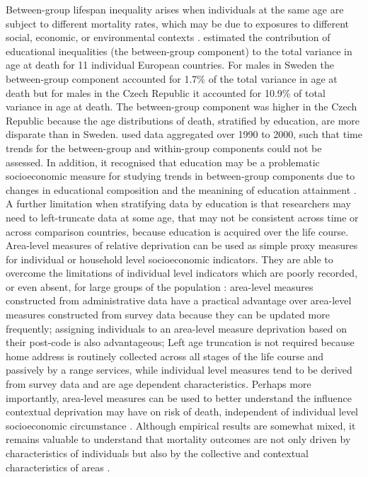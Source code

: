 \documentclass[12pt,oneside,a4paper]{article} %
\theoremstyle{definition}
\begin{document}
Between-group lifespan inequality arises when individuals at the same age are
subject to different mortality rates, which may be due to exposures to
different social, economic, or environmental contexts \citep{Hartemink2017}.
\citet{Raalte2012} estimated the contribution of educational inequalities (the
between-group component) to the total variance in age at death for 11 individual European countries. For males in Sweden the between-group component accounted for 1.7\% of the total variance in age at death but for males in the Czech Republic it accounted for 10.9\% of total variance in age at death. The between-group component was higher in the Czech Republic because the age distributions of death, stratified by education, are more disparate than in Sweden. 
\citet{Raalte2012} used data aggregated over 1990 to 2000, such
that time trends for the between-group and within-group components could not be assessed. 
In addition, it recognised that education may be a problematic socioeconomic
measure for studying trends in between-group components due to
changes in educational composition and the meanining of education attainment
\citep{Raalte2012,Hendi2015}.
A further limitation when stratifying data by education is that researchers
may need to left-truncate data at some age, that may not be consistent across time or across comparison countries, because education is acquired
over the life course. 
Area-level measures of relative deprivation can be used as simple proxy measures for individual or household level socioeconomic indicators. They are able to overcome the limitations of individual level indicators which are poorly recorded, or even absent, for large groups of the population \citep{Morgan2006}: area-level measures constructed from administrative data have a practical advantage over area-level measures constructed from survey data because they can be updated more frequently; assigning individuals to an area-level measure deprivation based on their post-code is also advantageous; Left age truncation is not required because home
address is routinely collected across all stages of the life course and
passively by a range services, while individual level measures tend to be derived from survey data and are age dependent characteristics. Perhaps more importantly, area-level measures can be used to better understand the influence contextual deprivation may have on risk of death, independent of individual level socioeconomic circumstance \citep{Carstairs1989,Macintyre2002,Tunstall2011}. Although empirical results are somewhat mixed, it remains valuable to understand that mortality outcomes are not only driven by characteristics of individuals but also by the collective and contextual characteristics of areas \citep{Macintyre2002}. 
\end{document}
